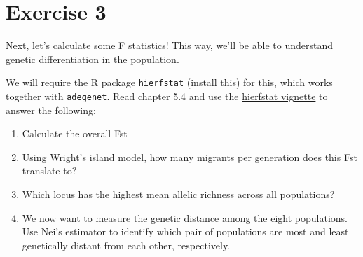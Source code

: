 \documentclass[
  letterpaper,
  DIV=11,
  numbers=noendperiod]{scrreprt}
\newenvironment{Shaded}{}{}
\newcommand{\AttributeTok}[1]{\textcolor[rgb]{0.84,0.23,0.29}{#1}}
\newcommand{\CommentTok}[1]{\textcolor[rgb]{0.42,0.45,0.49}{#1}}
\newcommand{\ConstantTok}[1]{\textcolor[rgb]{0.00,0.36,0.77}{#1}}
\newcommand{\FunctionTok}[1]{\textcolor[rgb]{0.44,0.26,0.76}{#1}}
\newcommand{\NormalTok}[1]{\textcolor[rgb]{0.14,0.16,0.18}{#1}}
\newcommand{\SpecialCharTok}[1]{\textcolor[rgb]{0.00,0.36,0.77}{#1}}
\newcommand{\StringTok}[1]{\textcolor[rgb]{0.01,0.18,0.38}{#1}}
\providecommand{\tightlist}{%
  \setlength{\itemsep}{0pt}\setlength{\parskip}{0pt}}\usepackage{longtable,booktabs,array}
\begin{document}
\begin{tcolorbox}
\begin{Shaded}
\end{Shaded}

\end{tcolorbox}

\section{Exercise 3}\label{exercise-3}

Next, let's calculate some F statistics! This way, we'll be able to
understand genetic differentiation in the population.

We will require the R package \texttt{hierfstat} (install this) for
this, which works together with \texttt{adegenet}. Read chapter 5.4 and
use the
\href{https://cran.r-project.org/web/packages/hierfstat/vignettes/hierfstat.html}{hierfstat
vignette} to answer the following:

\begin{enumerate}
\def\labelenumi{\arabic{enumi}.}
\tightlist
\item
  Calculate the overall Fst
\item
  Using Wright's island model, how many migrants per generation does
  this Fst translate to?
\item
  Which locus has the highest mean allelic richness across all
  populations?
\item
  We now want to measure the genetic distance among the eight
  populations. Use Nei's estimator to identify which pair of populations
  are most and least genetically distant from each other, respectively.
\end{enumerate}
\end{document}
